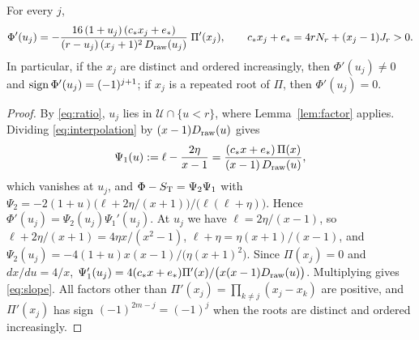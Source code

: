\begin{proposition}[Slopes]\label{prop:slope}
For every \(j\),
\begin{equation}\label{eq:slope}
 \Phi'(u_j)=-\frac{16\,(1+u_j)\,(c_\ast x_j+e_\ast)}{(r-u_j)\,(x_j+1)^2\,D_{\mathrm{raw}}(u_j)}\;\Pi'(x_j),
 \qquad c_\ast x_j+e_\ast=4rN_r+(x_j-1)J_r>0 .
\end{equation}
In particular, if the \(x_j\) are distinct and ordered increasingly, then \(\Phi'(u_j)\ne0\) and
\(\operatorname{sign}\Phi'(u_j)=(-1)^{j+1}\); if \(x_j\) is a repeated root of \(\Pi\), then \(\Phi'(u_j)=0\).
\end{proposition}
\begin{proof}
By \eqref{eq:ratio}, \(u_j\) lies in \(\mathcal U\cap\{u<r\}\), where Lemma~\ref{lem:factor}
applies. Dividing \eqref{eq:interpolation} by \((x-1)D_{\mathrm{raw}}(u)\) gives
\[
 \Psi_1(u):=\ell-\frac{2\eta}{x-1}=\frac{(c_\ast x+e_\ast)\,\Pi(x)}{(x-1)\,D_{\mathrm{raw}}(u)},
\]
which vanishes at \(u_j\), and \(\Phi-S_{\mathrm T}=\Psi_2\Psi_1\) with
\(\Psi_2=-2(1+u)\bigl(\ell+2\eta/(x+1)\bigr)/\bigl(\ell(\ell+\eta)\bigr)\). Hence
\(\Phi'(u_j)=\Psi_2(u_j)\Psi_1'(u_j)\). At \(u_j\) we have \(\ell=2\eta/(x-1)\), so
\(\ell+2\eta/(x+1)=4\eta x/(x^2-1)\), \(\ell+\eta=\eta(x+1)/(x-1)\), and
\(\Psi_2(u_j)=-4(1+u)x(x-1)/\bigl(\eta(x+1)^2\bigr)\). Since \(\Pi(x_j)=0\) and \(dx/du=4/x\),
\(\Psi_1'(u_j)=4(c_\ast x+e_\ast)\Pi'(x)/\bigl(x(x-1)D_{\mathrm{raw}}(u)\bigr)\). Multiplying gives
\eqref{eq:slope}. All factors other than \(\Pi'(x_j)=\prod_{k\ne j}(x_j-x_k)\) are positive, and
\(\Pi'(x_j)\) has sign \((-1)^{2m-j}=(-1)^j\) when the roots are distinct and ordered
increasingly.
\end{proof}

